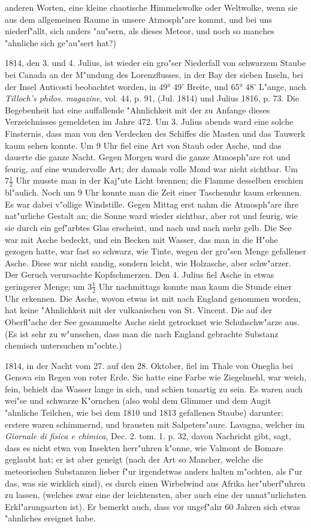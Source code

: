 \documentclass[a4paper, 11pt, oneside, polutonikogreek, german]{article}
\begin{document}
anderen Worten, eine kleine chaotische Himmelswolke oder Weltwolke, wenn sie aus dem allgemeinen Raume in unsere Atmosph"are kommt, und bei uns niederf"allt, sich anders "au"sern, als dieses Meteor, und noch so manches "ahnliche sich ge"au"sert hat?)

1814, den 3. und 4. Julius, ist wieder ein gro"ser Niederfall von schwarzem Staube bei Canada an der M"undung des Lorenzflusses, in der Bay der sieben Inseln, bei der Insel Anticosti beobachtet worden, in 49° 49' Breite, und 65° 48' L"ange, nach \emph{Tilloch's philos. magazine}, vol. 44, p. 91, (Jul. 1814) und Julius 1816, p. 73. Die Begebenheit hat eine auffallende "Ahnlichkeit mit der zu Anfange dieses Verzeichnisses gemeldeten im Jahre 472. Um 3. Julius abends ward eine solche Finsternis, dass man von den Verdecken des Schiffes die Masten und das Tauwerk kaum sehen konnte. Um 9 Uhr fiel eine Art von Staub oder Asche, und das dauerte die ganze Nacht. Gegen Morgen ward die ganze Atmosph"are rot und feurig, auf eine wundervolle Art; der damals volle Mond war nicht sichtbar. Um $\mathfrak{7\frac{1}{2}}$ Uhr musste man in der Kaj"ute Licht brennen; die Flamme desselben erschien bl"aulich. Noch um 9 Uhr konnte man die Zeit einer Taschenuhr kaum erkennen. Es war dabei v"ollige Windstille. Gegen Mittag erst nahm die Atmosph"are ihre nat"urliche Gestalt an; die Sonne ward wieder sichtbar, aber rot und feurig, wie sie durch ein gef"arbtes Glas erscheint, und nach und nach mehr gelb. Die See war mit Asche bedeckt, und ein Becken mit Wasser, das man in die H"ohe gezogen hatte, war fast so schwarz, wie Tinte, wegen der gro"sen Menge gefallener Asche. Diese war nicht sandig, sondern leicht, wie Holzasche, aber schw"arzer. Der Geruch verursachte Kopfschmerzen. Den 4. Julius fiel Asche in etwas geringerer Menge; um $\mathfrak{3\frac{1}{2}}$ Uhr nachmittags konnte man kaum die Stunde einer Uhr erkennen. Die Asche, wovon etwas ist mit nach England genommen worden, hat keine "Ahnlichkeit mit der vulkanischen von St. Vincent. Die auf der Oberfl"ache der See gesammelte Asche sieht getrocknet wie Schuhschw"arze aus. (Es ist sehr zu w"unschen, dass man die nach England gebrachte Substanz chemisch untersuchen m"ochte.)

1814, in der Nacht vom 27. auf den 28. Oktober, fiel im Thale von Oneglia bei Genova ein Regen von roter Erde. Sie hatte eine Farbe wie Ziegelmehl, war weich, fein, behielt das Wasser lange in sich, und schien tonartig zu sein. Es waren auch wei"se und schwarze K"ornchen (also wohl dem Glimmer und dem Augit "ahnliche Teilchen, wie bei dem 1810 und 1813 gefallenen Staube) darunter; erstere waren schimmernd, und brausten mit Salpeters"aure. Lavagna, welcher im \emph{Giornale di fisica e chimica}, Dec. 2. tom. 1. p. 32, davon Nachricht gibt, sagt, dass es nicht etwa von Insekten herr"uhren k"onne, wie Valmont de Bomare geglaubt hat; er ist aber geneigt (nach der Art so Mancher, welche die meteorischen Substanzen lieber f"ur irgendetwas anders halten m"ochten, als f"ur das, was sie wirklich sind), es durch einen Wirbelwind aus Afrika her"uberf"uhren zu lassen, (welches zwar eine der leichtensten, aber auch eine der unnat"urlichsten Erkl"arungsarten ist). Er bemerkt auch, dass vor ungef"ahr 60 Jahren sich etwas "ahnliches ereignet habe.
\end{document}
